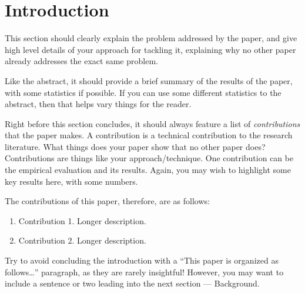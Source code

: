 \section{Introduction}
\label{sec:introduction}

%


This section should clearly explain the problem addressed 
by the paper, and give high level details of your approach
for tackling it, explaining why no other paper already
addresses the exact same problem.

Like the abstract, it should provide a brief summary of 
the results of the paper, with some statistics if possible. 
If you can use some different statistics to the 
abstract, then that helps vary things for the reader.

Right before this section concludes, it should always
feature a list of {\em contributions} that the paper makes.
A contribution is a technical contribution to the 
research literature. What things does your paper show
that no other paper does? Contributions are things 
like your approach/technique. 
One contribution can be the empirical evaluation and
its results. Again, you may wish to highlight some 
key results here, with some numbers. 

The contributions of this paper, therefore, are as follows:

\begin{enumerate}

    \item Contribution 1. Longer description.

    \item Contribution 2. Longer description.

\end{enumerate}    

Try to avoid concluding the introduction with a 
``This paper is organized as follows\ldots'' paragraph,
as they are rarely insightful! 
%
However, you may want to include a sentence or two 
leading into the next section --- Background.